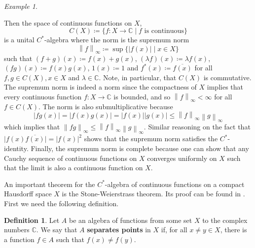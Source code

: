 \documentclass{article}
\theoremstyle{plain}
\theoremstyle{definition}
\newtheorem{definition}[theorem]{Definition}
\theoremstyle{remark}
\newtheorem{example}[theorem]{Example}
\newcommand{\norm}[1]{\left\lVert#1\right\rVert}
\begin{document}
\begin{example}
\begin{enumerate}
			Then the space of
			continuous functions on $X$,
			\begin{equation}
				C(X) \coloneqq \{f : X \rightarrow \mathbb{C} \mid f \text{ is continuous}\}
			\end{equation}
			is a unital $C^{*}$-algebra 
			where the norm is the supremum norm
			\begin{equation}
				\norm{f}_\infty 
				\coloneqq
				\sup\{\lvert f(x) \rvert \mid x \in X\}
			\end{equation}
			such that 
			$(f+g)(x) \coloneqq f(x) + g(x)$,
			$(\lambda{f})(x) \coloneqq \lambda{f(x)}$,
			$(fg)(x) \coloneqq f(x)g(x)$,
			$1(x) \coloneqq 1$ 
			and
			$f^*(x) \coloneqq \overline{f(x)}$
			for all $f, g \in C(X), x \in X$ and $\lambda \in \mathbb{C}$.
			Note, in particular, that $C(X)$ is commutative.
			The supremum norm is indeed a norm since 
			the compactness of $X$
			implies that every continuous function
			$f : X \rightarrow \mathbb{C}$ is bounded, and so
			$\norm{f}_\infty < \infty$
			for all $f \in C(X)$. 
			The norm is also submultiplicative because
			\begin{equation}
				\lvert fg(x) \rvert
				=
				\lvert f(x)g(x) \rvert
				=
				\lvert f(x) \rvert \lvert g(x) \rvert
				\leq
				\norm{f}_\infty \norm{g}_\infty 
			\end{equation}
			which implies that
			$\norm{fg}_\infty \leq \norm{f}_\infty \norm{g}_\infty$.
			Similar reasoning on the fact that
			$\lvert f(x)\overline{f(x)} \rvert = \lvert f(x) \rvert^2$
			shows that the supremum norm satisfies the $C^*$-identity.
			Finally, the supremum norm is complete because 
			one can show that any Cauchy sequence of continuous 
			functions on $X$
			converges uniformly on $X$ such that the limit
			is also a continuous function on $X$.
	\end{enumerate}
\end{example}

An important theorem for the $C^*$-algebra of continuous functions
on a compact Hausdorff space $X$
is the Stone-Weierstrass theorem.
Its proof can be found in \citet[Theorem 3.3]{speich}.
First we need the following definition.

\begin{definition}
	Let $A$ be an algebra of functions from some set $X$ to the complex numbers 
	$\mathbb{C}$. We say that $A$ \textbf{separates points} in $X$
	if, for all $x \neq y \in X$, there is a function $f \in A$ 
	such that $f(x) \neq f(y)$.
\end{definition}
\end{document}
